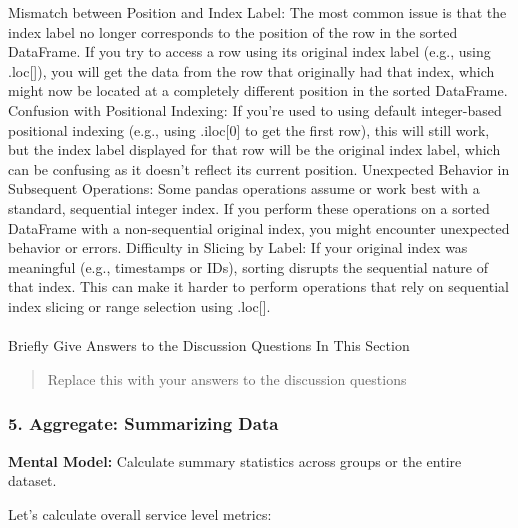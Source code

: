 \documentclass[
  letterpaper,
  DIV=11,
  numbers=noendperiod]{scrartcl}
\makeatletter
\let\oldparagraph\paragraph
\renewcommand{\paragraph}{
    \@ifstar
      \xxxParagraphStar
      \xxxParagraphNoStar
  }
\newcommand{\xxxParagraphStar}[1]{\oldparagraph*{#1}\mbox{}}
\newcommand{\xxxParagraphNoStar}[1]{\oldparagraph{#1}\mbox{}}
\makeatother
\begin{document}
\begin{tcolorbox}
Mismatch between Position and Index Label: The most common issue is that
the index label no longer corresponds to the position of the row in the
sorted DataFrame. If you try to access a row using its original index
label (e.g., using .loc{[}{]}), you will get the data from the row that
originally had that index, which might now be located at a completely
different position in the sorted DataFrame. Confusion with Positional
Indexing: If you're used to using default integer-based positional
indexing (e.g., using .iloc{[}0{]} to get the first row), this will
still work, but the index label displayed for that row will be the
original index label, which can be confusing as it doesn't reflect its
current position. Unexpected Behavior in Subsequent Operations: Some
pandas operations assume or work best with a standard, sequential
integer index. If you perform these operations on a sorted DataFrame
with a non-sequential original index, you might encounter unexpected
behavior or errors. Difficulty in Slicing by Label: If your original
index was meaningful (e.g., timestamps or IDs), sorting disrupts the
sequential nature of that index. This can make it harder to perform
operations that rely on sequential index slicing or range selection
using .loc{[}{]}.

\end{tcolorbox}

\paragraph{Briefly Give Answers to the Discussion Questions In This
Section}\label{briefly-give-answers-to-the-discussion-questions-in-this-section-3}

\begin{quote}
Replace this with your answers to the discussion questions
\end{quote}

\subsubsection{5. Aggregate: Summarizing
Data}\label{aggregate-summarizing-data}

\textbf{Mental Model:} Calculate summary statistics across groups or the
entire dataset.

Let's calculate overall service level metrics:
\end{document}
